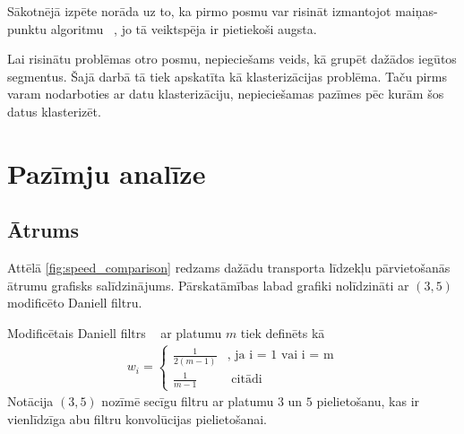 \documentclass{ludis}
\begin{document}
Sākotnējā izpēte norāda uz to, ka pirmo posmu var risināt izmantojot maiņas-punktu algo\-ritmu 
~\cite{zheng_gps_segmentation}, jo tā veiktspēja ir pietiekoši augsta.

Lai risinātu problēmas otro posmu, nepieciešams veids, kā grupēt dažādos iegūtos seg\-mentus.
Šajā darbā tā tiek apskatīta kā klasterizācijas problēma. Taču pirms varam nodarboties ar 
datu klasterizāciju, nepieciešamas pazīmes pēc kurām šos datus klasterizēt.

\section{Pazīmju analīze}
\subsection{Ātrums}
Attēlā \ref{fig:speed_comparison} redzams dažādu transporta līdzekļu pārvietošanās ātrumu grafisks
salīdzinājums. Pārskatāmības labad grafiki nolīdzināti ar $(3, 5)$ modificēto Daniell filtru.

Modificētais Daniell filtrs ~\cite{daniell1946} ar platumu $m$ tiek definēts kā 
\begin{align*}
  w_i = \begin{cases}
    \frac{1}{2 (m - 1)} &\text{, ja i = 1 vai i = m}\\
    \frac{1}{m - 1} &\text{ citādi}
    \end{cases}
\end{align*}
Notācija $(3, 5)$ nozīmē secīgu filtru ar platumu $3$ un $5$ pielietošanu, kas ir vienlīdzīga
abu filtru konvolūcijas pielietošanai.
\end{document}
